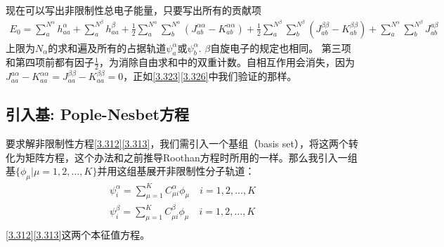 {现在可以写出非限制性总电子能量，只要写出所有的贡献项
\begin{align}
    E_{0}=\sum_{a}^{N^{\alpha}} h_{a a}^{\alpha}+\sum_{a}^{N^{\beta}} h_{a a}^{\beta}+\frac{1}{2} \sum_{a}^{N^{\alpha}} \sum_{b}^{N^{\alpha}}\left(J_{a b}^{\alpha \alpha}-K_{a b}^{\alpha \alpha}\right)+\frac{1}{2} \sum_{a}^{N^{\beta}} \sum_{b}^{N^{\beta}}\left(J_{a b}^{\beta \beta}-K_{a b}^{\beta \beta}\right)+\sum_{a}^{N^{\alpha}} \sum_{b}^{N^{\beta}} J_{a b}^{a \beta}
\end{align}
上限为$N_\alpha$的求和遍及所有的占据轨道$\psi_a^\alpha$或$\psi_b^\alpha$. $\beta$自旋电子的规定也相同。 第三项和第四项前都有因子$\frac{1}{2}$，为消除自由求和中的双重计数。自相互作用会消失，因为$J_{a a}^{a \alpha}-K_{a a}^{\alpha \alpha}=J_{a a}^{\beta \beta}-K_{a a}^{\beta \beta}=0$，正如\eqref{3.323}\eqref{3.326}中我们验证的那样。
\subsection{引入基: Pople-Nesbet方程}
要求解非限制性\hft 方程\eqref{3.312}\eqref{3.313}，我们需引入一个基组（basis set），将这两个转化为矩阵方程，这个办法和之前推导Roothan方程时所用的一样。那么我引入一组基$\{\phi_\mu|\mu = 1,2,\ldots,K\}$并用这组基展开非限制性分子轨道：
\begin{align}
    \psi_i^\alpha = \sum_{\mu=1}^K C_{\mu i}^\alpha \phi_\mu \quad i =1,2,\ldots,K \\
    \psi_i^\beta = \sum_{\mu=1}^K C_{\mu i}^\beta \phi_\mu \quad i =1,2,\ldots,K\\
\end{align}
\eqref{3.312}\eqref{3.313}这两个本征值方程。
}
